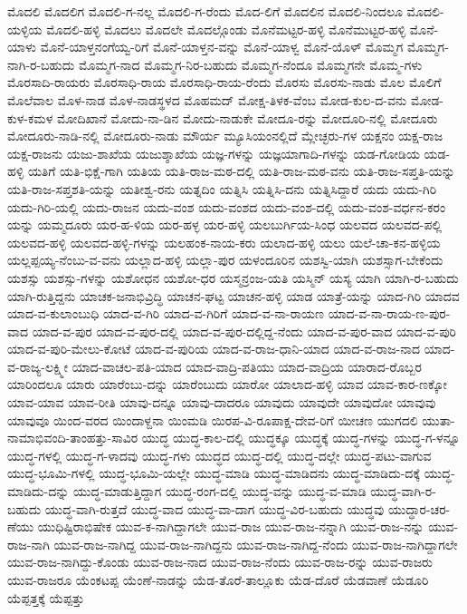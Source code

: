 {ಮೊದಲಿ
ಮೊದಲಿಗ
ಮೊದಲಿ-ಗ-ನಲ್ಲ
ಮೊದಲಿ-ಗ-ರೆಂದು
ಮೊದ-ಲಿಗೆ
ಮೊದಲಿನ
ಮೊದಲಿ-ನಿಂದಲೂ
ಮೊದಲಿ-ಯಳ್ಳಿಯ
ಮೊದಲಿ-ಹಳ್ಳಿ
ಮೊದಲು
ಮೊದಲೇ
ಮೊದಲ್ಗೊಂಡು
ಮೊನೆಮಟ್ಟರ-ಹಳ್ಳಿ
ಮೊನೆಮುಟ್ಟರ-ಹಳ್ಳಿ
ಮೊನೆ-ಯಾಳು
ಮೊನೆ-ಯಾಳ್ತನಂಗೆಯ್ವ-ರಿಗೆ
ಮೊನೆ-ಯಾಳ್ತನ-ವನ್ನು
ಮೊನೆ-ಯಾಳ್ವ
ಮೊನೆ-ಯೊಳ್
ಮೊಮ್ಮಗ
ಮೊಮ್ಮಗ-ನಾಗಿ-ರ-ಬಹುದು
ಮೊಮ್ಮಗ-ನಾದ
ಮೊಮ್ಮಗ-ನಿರ-ಬಹುದು
ಮೊಮ್ಮಗ-ನೆಂದೂ
ಮೊಮ್ಮಗನೇ
ಮೊಮ್ಮ-ಗಳು
ಮೊರಸಾದಿ-ರಾಯರು
ಮೊರಸಾಧಿ-ರಾಯ
ಮೊರಸಾಧಿ-ರಾಯ-ರೆಂದು
ಮೊರಸು
ಮೊರಸು-ನಾಡು
ಮೊಲ
ಮೊಲಿಗೆ
ಮೊಲೆವಾಲ
ಮೊಳ-ನಾಡ
ಮೊಳ-ನಾಡಸ್ಥಳದ
ಮೊಹಮದ್
ಮೋಕ್ಷ-ತಿಳಕ-ವೆಂಬ
ಮೋಡ-ಕುಲ-ದ-ವನು
ಮೋಡ-ಕುಳ-ಕಮಳ
ಮೋದಿಖಾನೆ
ಮೋದು-ನಾ-ಡಿನ
ಮೋದು-ನಾಡುಕೇ
ಮೋದೂ-ರನ್ನು
ಮೋದೂರಿ-ನಲ್ಲಿ
ಮೋದೂರು
ಮೋದೂರು-ನಾಡಿ-ನಲ್ಲಿ
ಮೋದೂರು-ನಾಡು
ಮೌರ್ಯ
ಮ್ಯೂಸಿಯಂನಲ್ಲಿದೆ
ಮ್ಲೇಚ್ಛರು-ಗಳ
ಯಕ್ಷನಂ
ಯಕ್ಷ-ರಾಜ
ಯಕ್ಷ-ರಾಜನು
ಯಜು-ಶಾಖೆಯ
ಯಜುಶ್ಶಾಖೆಯ
ಯಜ್ಞ-ಗಳನ್ನು
ಯಜ್ಞಯಾಗಾದಿ-ಗಳನ್ನು
ಯಡ-ಗೋಡಿಯ
ಯಡ-ಹಳ್ಳಿ
ಯತಿಗೆ
ಯತಿ-ಭಿಕ್ಷೆ-ಗಾಗಿ
ಯತಿಯ
ಯತಿ-ರಾಜ-ಮಠ-ದಲ್ಲಿ
ಯತಿ-ರಾಜ-ಮಠ-ವನು
ಯತಿ-ರಾಜ-ಸಪ್ತತಿ-ಯನ್ನು
ಯತಿ-ರಾಜ-ಸಪ್ತಶತಿ-ಯನ್ನು
ಯತೀಶ್ವ-ರನು
ಯತ್ನದಿಂ
ಯತ್ನಿಸಿ
ಯತ್ನಿಸಿ-ದನು
ಯತ್ನಿಸಿದ್ದಾರೆ
ಯದು
ಯದು-ಗಿರಿ
ಯದು-ಗಿರಿ-ಯಲ್ಲಿ
ಯದು-ರಾಜನ
ಯದು-ವಂಶ
ಯದು-ವಂಶದ
ಯದು-ವಂಶ-ದಲ್ಲಿ
ಯದು-ವಂಶ-ವರ್ಧನ-ಕರಂ
ಯನ್ನು
ಯಮ್ಮದೂರು
ಯರ-ಹ-ಳಿಯ
ಯರ-ಹಳ್ಳ
ಯರ-ಹಳ್ಳಿ
ಯಲಬುರ್ಗಿಯ-ಸಿಂಧ
ಯಲವದ
ಯಲವದ-ಪಲ್ಲಿ
ಯಲವದ-ಹಳ್ಳಿ
ಯಲವದ-ಹಳ್ಳಿ-ಗಳನ್ನು
ಯಲಹಂಕ-ನಾಯ-ಕರು
ಯಲಾದ-ಹಳ್ಳಿ
ಯಲು
ಯಲೆ-ಚಾ-ಕನ-ಹಳ್ಳಿಯ
ಯಲ್ಲಪ್ಪಯ್ಯ-ನೆಂಬು-ವ-ವನು
ಯಲ್ಲಾದ-ಹಳ್ಳಿ
ಯಲ್ಲಾ-ಪುರ
ಯಳಂದೂರಿನ
ಯಶಸ್ವಿ-ಯಾಗಿ
ಯಶಸ್ಸಾಗ-ಬೇಕೆಂದು
ಯಶಸ್ಸು
ಯಶಸ್ಸು-ಗಳನ್ನು
ಯಶೋಧನ
ಯಶೋ-ಧರ
ಯಸ್ಮನ್ರಂಜ-ಯತಿ
ಯಸ್ಮಿನ್
ಯಸ್ಯ
ಯಾಗಿ
ಯಾಗಿ-ರ-ಬಹುದು
ಯಾಗಿ-ರುತ್ತಿದ್ದನು
ಯಾಚಕ-ಜನಾಭಿವ್ರಿದ್ಧಿ
ಯಾಚನ-ಘಟ್ಟ
ಯಾಚನ-ಹಳ್ಳಿ
ಯಾಡ
ಯಾತ್ರೆ-ಯನ್ನು
ಯಾದ-ಗಿರಿ
ಯಾದವ
ಯಾದ-ವ-ಕುಲಾಂಬುಧಿ
ಯಾದ-ವ-ಗಿರಿ
ಯಾದ-ವ-ಗಿರಿಗೆ
ಯಾದ-ವ-ನಾ-ರಾಯಣ
ಯಾದ-ವ-ನಾ-ರಾಯ-ಣ-ಪುರ-ವಾದ
ಯಾದ-ವ-ಪುರ
ಯಾದ-ವ-ಪುರ-ದಲ್ಲಿ
ಯಾದ-ವ-ಪುರ-ದಲ್ಲಿದ್ದ-ನೆಂದು
ಯಾದ-ವ-ಪುರ-ವಾದ
ಯಾದ-ವ-ಪುರಿ
ಯಾದ-ವ-ಪುರಿ-ಮೇಲು-ಕೋಟೆ
ಯಾದ-ವ-ಪುರಿಯ
ಯಾದ-ವ-ರಾಜ-ಧಾನಿ-ಯಾದ
ಯಾದ-ವ-ರಾಜ-ನಾದ
ಯಾದ-ವ-ರಾಜ್ಯ-ಲಕ್ಷ್ಮೀ
ಯಾದ-ವಾಚಲ-ಪತಿ-ಯಾದ
ಯಾದ-ವಾದ್ರಿ-ಪತಿಯು
ಯಾದ-ವಾದ್ರಿಯ
ಯಾರಾದ-ರೊಬ್ಬರ
ಯಾರಿಂದಲೂ
ಯಾರು
ಯಾರೆಂಬು-ದನ್ನು
ಯಾರೆಂಬುದು
ಯಾರೋ
ಯಾಲಾದ-ಹಳ್ಳಿ
ಯಾವ
ಯಾವ-ಕಾರ-ಣಕ್ಕೋ
ಯಾವ-ಯಾವ
ಯಾವ-ರೀತಿ
ಯಾವು-ದನ್ನೂ
ಯಾವು-ದಾದರೂ
ಯಾವುದು
ಯಾವುದೇ
ಯಾವುದೋ
ಯಾವುವು
ಯಾವುವೂ
ಯಿಂದ-ವರದ
ಯಿಂದಾಳ್ದನಾ
ಯಿಂಮಡಿ
ಯಿರಪ-ವಿ-ರೂಪಾಕ್ಷ-ದೇವ-ರಿಗೆ
ಯೀಚಣ
ಯುಗದಲಿ
ಯುತಾ-ನಾಮಾಭಿವಂದಿ-ತಾಂಹತ್ತು-ಸಾವಿರ
ಯುದ್ಧ
ಯುದ್ಧ-ಕಾಲ-ದಲ್ಲಿ
ಯುದ್ಧಕ್ಕೂ
ಯುದ್ಧಕ್ಕೆ
ಯುದ್ಧ-ಗಳನ್ನು
ಯುದ್ಧ-ಗ-ಳನ್ನೂ
ಯುದ್ಧ-ಗಳಲ್ಲಿ
ಯುದ್ಧ-ಗ-ಳಾದವು
ಯುದ್ಧ-ಗಳು
ಯುದ್ಧದ
ಯುದ್ಧ-ದಲ್ಲಿ
ಯುದ್ಧ-ದಲ್ಲೇ
ಯುದ್ಧ-ಪಟು-ವಾಗುವ
ಯುದ್ಧ-ಭೂಮಿ-ಗಳಲ್ಲಿ
ಯುದ್ಧ-ಭೂಮಿ-ಯಲ್ಲೇ
ಯುದ್ಧ-ಮಾಡಿ
ಯುದ್ಧ-ಮಾಡಿದನು
ಯುದ್ಧ-ಮಾಡಿದು-ದಕ್ಕೆ
ಯುದ್ಧ-ಮಾಡಿದು-ದನ್ನು
ಯುದ್ಧ-ಮಾಡುತ್ತಿದ್ದಾಗ
ಯುದ್ಧ-ರಂಗ-ದಲ್ಲಿ
ಯುದ್ಧ-ವನ್ನು
ಯುದ್ಧ-ವ-ಮಾಡಿ
ಯುದ್ಧ-ವಾಗಿ-ರ-ಬಹುದು
ಯುದ್ಧ-ವಾಗಿ-ರುತ್ತದೆ
ಯುದ್ಧ-ವಾದ
ಯುದ್ಧ-ವಾ-ದಾಗ
ಯುದ್ಧ-ವಿರ-ಬಹುದು
ಯುದ್ಧವು
ಯುದ್ಧಾರ-ಚರ-ಣೆಯು
ಯುಧಿಷ್ಟಿರಾಭಿಷೇಕ
ಯುವ-ಕ-ನಾಗಿದ್ದಾಗಲೇ
ಯುವ-ರಾಜ
ಯುವ-ರಾಜ-ನನ್ನಾಗಿ
ಯುವ-ರಾಜ-ನನ್ನು
ಯುವ-ರಾಜ-ನಾಗಿ
ಯುವ-ರಾಜ-ನಾಗಿದ್ದ
ಯುವ-ರಾಜ-ನಾಗಿದ್ದನು
ಯುವ-ರಾಜ-ನಾಗಿದ್ದ-ನೆಂದು
ಯುವ-ರಾಜ-ನಾಗಿದ್ದಾಗಲೇ
ಯುವ-ರಾಜ-ನಾಗಿದ್ದು-ಕೊಂಡು
ಯುವ-ರಾಜ-ನಾದ
ಯುವ-ರಾಜ-ನೆಂದು
ಯುವ-ರಾಜ-ರನ್ನು
ಯುವ-ರಾಜರು
ಯುವ-ರಾಜರೂ
ಯೆಂಕಟಪ್ಪ
ಯೆಂಣೆ-ನಾಡನ್ನು
ಯೆಡ-ತೊರೆ-ತಾಲ್ಲೂಕು
ಯೆಡ-ದೊರೆ
ಯೆಡವಾಣೆ
ಯೆಡೂರಿ
ಯೆಪ್ಪತ್ತಕ್ಕೆ
ಯೆಪ್ಪತ್ತು
}

